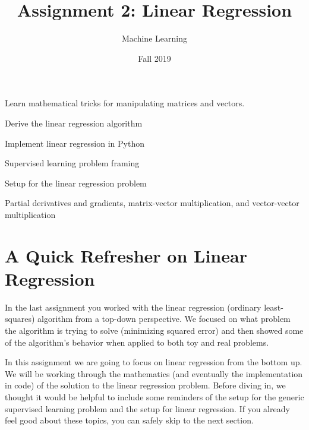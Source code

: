 \documentclass[assignment02_Solutions]{subfiles}
\title{Assignment 2: Linear Regression}
\author{Machine Learning}
\date{Fall 2019}
\begin{document}
\maketitle
\thispagestyle{firstpage}



\begin{learningobjectives}
\bi
\item Learn mathematical tricks for manipulating matrices and vectors.
\item Derive the linear regression algorithm
\item Implement linear regression in Python
\ei
\end{learningobjectives}

\begin{priorknowledge}
\bi
\item Supervised learning problem framing
\item Setup for the linear regression problem
\item Partial derivatives and gradients, matrix-vector multiplication, and vector-vector multiplication
\ei
\end{priorknowledge}




\section{A Quick Refresher on Linear Regression}

In the last assignment you worked with the linear regression (ordinary least-squares) algorithm from a top-down perspective.  We focused on what problem the algorithm is trying to solve (minimizing squared error) and then showed some of the algorithm's behavior when applied to both toy and real problems.

In this assignment we are going to focus on linear regression from the bottom up.  We will be working through the mathematics (and eventually the implementation in code) of the solution to the linear regression problem.  Before diving in, we thought it would be helpful to include some reminders of the setup for the generic supervised learning problem and the setup for linear regression.  If you already feel good about these topics, you can safely skip to the next section.

\vspace{1em}
\end{document}
